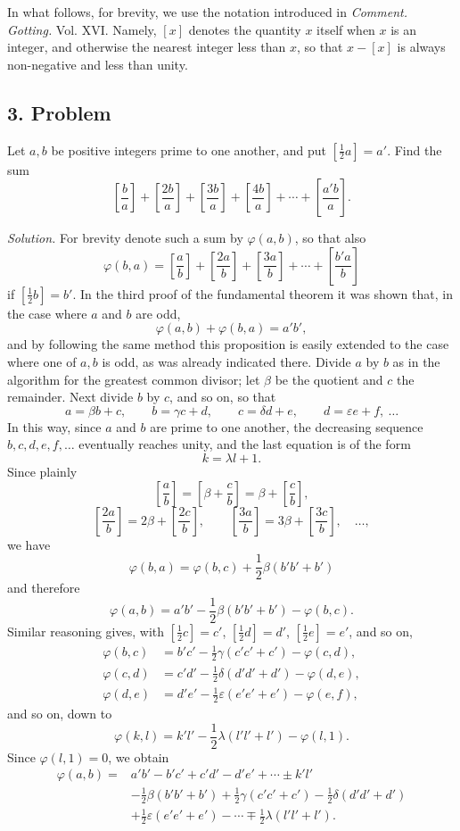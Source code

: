 \documentclass[12pt]{article}
\begin{document}
In what follows, for brevity, we use the notation introduced in \emph{Comment. Gotting.} Vol. XVI. Namely, $[x]$ denotes the quantity $x$ itself when $x$ is an integer, and otherwise the nearest integer less than $x$, so that $x-[x]$ is always non-negative and less than unity.

\subsection*{3. Problem}

Let $a,b$ be positive integers prime to one another, and put $\left[\frac12a\right]=a'$. Find the sum
\[
\left[\frac{b}{a}\right]+\left[\frac{2b}{a}\right]+\left[\frac{3b}{a}\right]+\left[\frac{4b}{a}\right]+\cdots+\left[\frac{a'b}{a}\right].
\]

\emph{Solution.} For brevity denote such a sum by $\varphi(a,b)$, so that also
\[
\varphi(b,a)=\left[\frac{a}{b}\right]+\left[\frac{2a}{b}\right]+\left[\frac{3a}{b}\right]+\cdots+\left[\frac{b'a}{b}\right]
\]
if $\left[\frac12b\right]=b'$. In the third proof of the fundamental theorem it was shown that, in the case where $a$ and $b$ are odd,
\[
\varphi(a,b)+\varphi(b,a)=a'b',
\]
and by following the same method this proposition is easily extended to the case where one of $a,b$ is odd, as was already indicated there. Divide $a$ by $b$ as in the algorithm for the greatest common divisor; let $\beta$ be the quotient and $c$ the remainder. Next divide $b$ by $c$, and so on, so that
\[
a=\beta b+c,\qquad b=\gamma c+d,\qquad c=\delta d+e,\qquad d=\varepsilon e+f,\ \ldots
\]
In this way, since $a$ and $b$ are prime to one another, the decreasing sequence $b,c,d,e,f,\ldots$ eventually reaches unity, and the last equation is of the form
\[
k=\lambda l+1.
\]
Since plainly
\[
\left[\frac{a}{b}\right]=\left[\beta+\frac{c}{b}\right]=\beta+\left[\frac{c}{b}\right],
\]
\[
\left[\frac{2a}{b}\right]=2\beta+\left[\frac{2c}{b}\right],\qquad
\left[\frac{3a}{b}\right]=3\beta+\left[\frac{3c}{b}\right],\quad\ldots,
\]
we have
\[
\varphi(b,a)=\varphi(b,c)+\frac12\beta(b'b'+b')
\]
and therefore
\[
\varphi(a,b)=a'b'-\frac12\beta(b'b'+b')-\varphi(b,c).
\]
Similar reasoning gives, with $\left[\frac12c\right]=c'$, $\left[\frac12d\right]=d'$, $\left[\frac12e\right]=e'$, and so on,
\[
\begin{aligned}
\varphi(b,c)&=b'c'-\frac12\gamma(c'c'+c')-\varphi(c,d),\\
\varphi(c,d)&=c'd'-\frac12\delta(d'd'+d')-\varphi(d,e),\\
\varphi(d,e)&=d'e'-\frac12\varepsilon(e'e'+e')-\varphi(e,f),
\end{aligned}
\]
and so on, down to
\[
\varphi(k,l)=k'l'-\frac12\lambda(l'l'+l')-\varphi(l,1).
\]
Since $\varphi(l,1)=0$, we obtain
\[
\begin{aligned}
\varphi(a,b)= {}& a'b'-b'c'+c'd'-d'e'+\cdots\pm k'l'\\
&-\frac12\beta(b'b'+b')+\frac12\gamma(c'c'+c')-\frac12\delta(d'd'+d')\\
&+\frac12\varepsilon(e'e'+e')-\cdots\mp\frac12\lambda(l'l'+l').
\end{aligned}
\]
\end{document}
